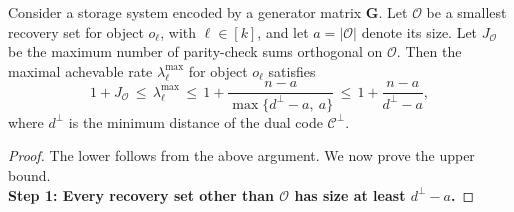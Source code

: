 \documentclass[10pt,a4paper]{amsart}
\begin{document}
\begin{theorem}\label{thm:general_bound_demand}
Consider a storage system encoded by a generator matrix \( \boldsymbol{G} \). Let \( \mathcal{O} \) be a smallest recovery set for object \( o_\ell \), with \( \ell \in [k] \), and let \( a = |\mathcal{O}| \) denote its size. Let \( J_{\mathcal{O}} \) be the maximum number of parity-check sums orthogonal on \( \mathcal{O} \). Then the maximal achevable rate \( \lambda_\ell^{\max} \) for object \( o_\ell \) satisfies
\[
1 + J_{\mathcal{O}} \,\le\, \lambda_{\ell}^{\max} \,\le\, 1 + \frac{n - a}{\max\{d^\perp - a,\ a\}} \,\le\, 1 + \frac{n - a}{d^\perp - a},
\]
where \( d^{\perp} \) is the minimum distance of the dual code \( \mathcal{C}^{\perp} \).
\end{theorem}

\begin{proof}
The lower follows from the above argument. We now prove the upper bound.
\\[2ex]
\textbf{Step 1: Every recovery set other than \( \mathcal{O} \) has size at least \( d^\perp - a \).}


\end{proof}
\end{document}

